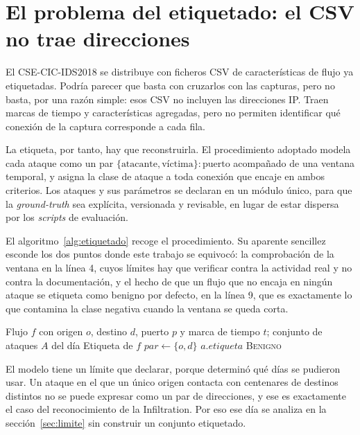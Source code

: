\section{El problema del etiquetado: el CSV no trae direcciones}
\label{sec:etiquetado}

El CSE-CIC-IDS2018 se distribuye con ficheros CSV de características de flujo ya
etiquetadas. Podría parecer que basta con cruzarlos con las capturas, pero no
basta, por una razón simple: esos CSV no incluyen las direcciones IP. Traen
marcas de tiempo y características agregadas, pero no permiten identificar qué
conexión de la captura corresponde a cada fila.

La etiqueta, por tanto, hay que reconstruirla. El procedimiento adoptado modela
cada ataque como un par $\{\text{atacante}, \text{víctima}\}:\text{puerto}$
acompañado de una ventana temporal, y asigna la clase de ataque a toda conexión
que encaje en ambos criterios. Los ataques y sus parámetros se declaran en un
módulo único, para que la \emph{ground-truth} sea explícita, versionada y
revisable, en lugar de estar dispersa por los \emph{scripts} de evaluación.

El algoritmo~\ref{alg:etiquetado} recoge el procedimiento. Su aparente
sencillez esconde los dos puntos donde este trabajo se equivocó: la comprobación
de la ventana en la línea 4, cuyos límites hay que verificar contra la actividad
real y no contra la documentación, y el hecho de que un flujo que no encaja en
ningún ataque se etiqueta como benigno por defecto, en la línea 9, que es
exactamente lo que contamina la clase negativa cuando la ventana se queda corta.

\begin{algorithm}[htbp]
\caption{Etiquetado de un flujo a partir de la \emph{ground-truth} verificada}
\label{alg:etiquetado}
\begin{algorithmic}[1]
\Require Flujo $f$ con origen $o$, destino $d$, puerto $p$ y marca de tiempo $t$;
         conjunto de ataques $A$ del día
\Ensure Etiqueta de $f$
  \State $\mathit{par} \gets \{o, d\}$
      \State \Return $a.\mathit{etiqueta}$
    \EndIf
  \EndIf
\EndFor
\State \Return \textsc{Benigno}
\end{algorithmic}
\end{algorithm}

El modelo tiene un límite que declarar, porque determinó qué días se
pudieron usar. Un ataque en el que un único origen contacta con centenares de
destinos distintos no se puede expresar como un par de direcciones, y ese es
exactamente el caso del reconocimiento de la Infiltration. Por eso ese día se
analiza en la sección~\ref{sec:limite} sin construir un conjunto etiquetado.

